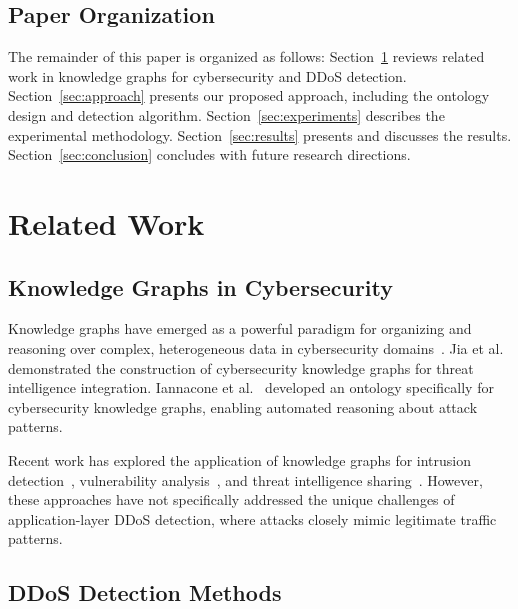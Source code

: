 \documentclass[preprint,12pt]{elsarticle}
\begin{document}
\subsection{Paper Organization}

The remainder of this paper is organized as follows: Section~\ref{sec:related} reviews related work in knowledge graphs for cybersecurity and DDoS detection. Section~\ref{sec:approach} presents our proposed approach, including the ontology design and detection algorithm. Section~\ref{sec:experiments} describes the experimental methodology. Section~\ref{sec:results} presents and discusses the results. Section~\ref{sec:conclusion} concludes with future research directions.


\section{Related Work}
\label{sec:related}

\subsection{Knowledge Graphs in Cybersecurity}

Knowledge graphs have emerged as a powerful paradigm for organizing and reasoning over complex, heterogeneous data in cybersecurity domains~\cite{hogan2021knowledge}. Jia et al.~\cite{jia2018practical} demonstrated the construction of cybersecurity knowledge graphs for threat intelligence integration. Iannacone et al.~\cite{iannacone2015developing} developed an ontology specifically for cybersecurity knowledge graphs, enabling automated reasoning about attack patterns.

Recent work has explored the application of knowledge graphs for intrusion detection~\cite{noel2015cyber}, vulnerability analysis~\cite{husari2017using}, and threat intelligence sharing~\cite{pingle2019relext}. However, these approaches have not specifically addressed the unique challenges of application-layer DDoS detection, where attacks closely mimic legitimate traffic patterns.

\subsection{DDoS Detection Methods}
\end{document}
